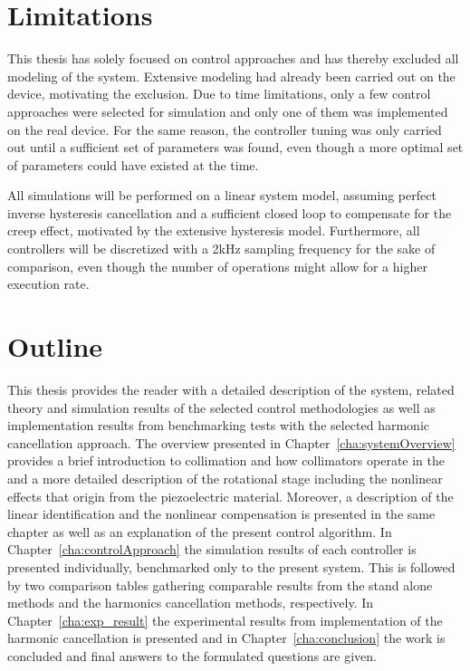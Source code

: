 \section{Limitations}
This thesis has solely focused on control approaches and has thereby excluded all modeling of the system. Extensive modeling had already been carried out on the device, motivating the exclusion. Due to time limitations, only a few control approaches were selected for simulation and only one of them was implemented on the real device. For the same reason, the controller tuning was only carried out until a sufficient set of parameters was found, even though a more optimal set of parameters could have existed at the time.

All simulations will be performed on a linear system model, assuming perfect inverse hysteresis cancellation and a sufficient closed loop to compensate for the creep effect, motivated by the extensive hysteresis model. Furthermore, all controllers will be discretized with a 2kHz sampling frequency for the sake of comparison, even though the number of operations might allow for a higher execution rate.

\section{Outline}
This thesis provides the reader with a detailed description of the system, related theory and simulation results of the selected control methodologies as well as implementation results from benchmarking tests with the selected harmonic cancellation approach. The overview presented in Chapter~\ref{cha:systemOverview} provides a brief introduction to collimation and how collimators operate in the \abbrLHC and a more detailed description of the rotational stage including the nonlinear effects that origin from the piezoelectric material. Moreover, a description of the linear identification and the nonlinear compensation is presented in the same chapter as well as an explanation of the present control algorithm. In Chapter~\ref{cha:controlApproach} the simulation results of each controller is presented individually, benchmarked only to the present system. This is followed by two comparison tables gathering comparable results from the stand alone methods and the harmonics cancellation methods, respectively. In Chapter~\ref{cha:exp_result} the experimental results from implementation of the harmonic cancellation is presented and in Chapter~\ref{cha:conclusion} the work is concluded and final answers to the formulated questions are given.
